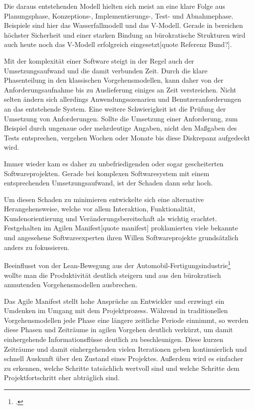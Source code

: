 Die daraus entstehenden Modell hielten sich meist an eine klare Folge aus Planungsphase,  Konzeptions-, Implementierungs-, Test- und Abnahmephase. Beispiele sind hier das Wasserfallmodell und das V-Modell. Gerade in bereichen höchster Sicherheit und einer starken Bindung an bürokratische Strukturen wird auch heute noch das V-Modell erfolgreich eingesetzt[quote Referenz Bund?].

Mit der komplexität einer Software steigt in der Regel auch der Umsetzungsaufwand und die damit verbunden Zeit. Durch die klare Phasenteilung in den klassischen Vorgehensmodellen, kann daher von der Anforderungsaufnahme bis zu Auslieferung einiges an Zeit verstreichen. Nicht selten ändern sich allerdings Anwendungsszenarien und Benutzeranforderungen an das entstehende System. Eine weitere Schwierigkeit ist die Prüfung der Umsetzung von Anforderungen. Sollte die Umsetzung einer Anforderung, zum Beispiel durch ungenaue oder mehrdeutige Angaben, nicht den Maßgaben des Tests entsprechen, vergehen Wochen oder Monate bis diese Diskrepanz aufgedeckt wird.

Immer wieder kam es daher zu unbefriedigenden oder sogar gescheiterten Softwareprojekten. Gerade bei komplexen Softwaresystem mit einem entsprechenden Umsetzungsaufwand, ist der Schaden dann sehr hoch.

Um diesen Schaden zu minimieren entwickelte sich eine alternative Herangehensweise, welche vor allem Interaktion, Funktionalität, Kundenorientierung und Veränderungsbereitschaft als wichtig erachtet. Festgehalten im Agilen Manifest[quote manifest] proklamierten viele bekannte und angesehene Softwareexperten ihren Willen Softwareprojekte grundsätzlich anders zu fokussieren.

Beeinflusst von der Lean-Bewegung aus der Automobil-Fertigungsindustrie\footcite{kent1999} wollte man die Produktivität deutlich steigern und aus den bürokratisch anmutenden Vorgehensmodellen ausbrechen.

Das Agile Manifest stellt hohe Ansprüche an Entwickler und erzwingt ein Umdenken im Umgang mit dem Projektprozess. Während in traditionellen Vorgehensmodellen jede Phase eine längere zeitliche Periode einnimmt, so werden diese Phasen und Zeiträume in agilen Vorgehen deutlich verkürzt, um damit einhergehende Informationsflüsse deutlich zu beschleunigen.
Diese kurzen Zeiträume und damit einhergehenden vielen Iterationen geben kontinuierlich und schnell Auskunft über den Zustand eines Projektes. Außerdem wird es einfacher zu erkennen, welche Schritte tatsächlich wertvoll sind und welche Schritte dem Projektfortschritt eher abträglich sind. 

